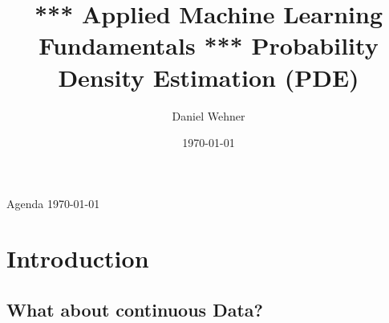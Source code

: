 


\title[Probability Density Estimation]{*** Applied Machine Learning Fundamentals *** Probability Density Estimation (PDE)}
\author{Daniel Wehner}
\date{\today}




\maketitlepage


\begin{frame}{Agenda \today}
	\begin{multicols}{2}
		\tableofcontents
	\end{multicols}
\end{frame}


\section{Introduction}

\subsection{What about continuous Data?}

